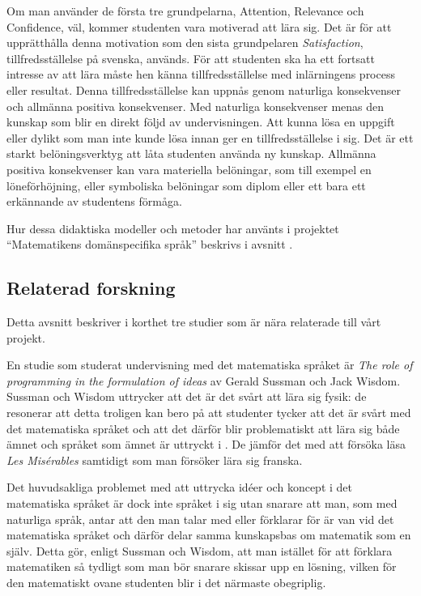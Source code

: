 \documentclass[12pt,a4paper,twoside,openright]{article}
\begin{document}
Om man använder de första tre grundpelarna, Attention, Relevance och
Confidence, väl, kommer studenten vara motiverad att lära sig. Det är
för att upprätthålla denna motivation som den sista grundpelaren
\textit{Satisfaction}, tillfredsställelse på svenska, används. För att
studenten ska ha ett fortsatt intresse av att lära måste hen känna
tillfredsställelse med inlärningens process eller resultat. Denna
tillfredsställelse kan uppnås genom naturliga konsekvenser och
allmänna positiva konsekvenser. Med naturliga konsekvenser menas den
kunskap som blir en direkt följd av undervisningen. Att kunna lösa en
uppgift eller dylikt som man inte kunde lösa innan ger en
tillfredsställelse i sig. Det är ett starkt belöningsverktyg att låta
studenten använda ny kunskap. Allmänna positiva konsekvenser kan vara
materiella belöningar, som till exempel en löneförhöjning, eller
symboliska belöningar som diplom eller ett bara ett erkännande av
studentens förmåga.

Hur dessa didaktiska modeller och metoder har använts i projektet
``Matematikens domänspecifika språk'' beskrivs i avsnitt
.

\subsection{Relaterad forskning}
\label{sec:relForsk}
Detta avsnitt beskriver i korthet tre studier som är nära relaterade
till vårt projekt.

En studie som studerat undervisning med det matematiska språket är
\textit{The role of programming in the formulation of ideas} av Gerald
Sussman och Jack Wisdom. Sussman och Wisdom uttrycker att det är det
svårt att lära sig fysik: de resonerar att detta troligen kan bero på
att studenter tycker att det är svårt med det matematiska språket och
att det därför blir problematiskt att lära sig både ämnet och språket
som ämnet är uttryckt i \cite{sussman2002role}. De jämför det med att
försöka läsa \textit{Les Misérables} samtidigt som man försöker lära
sig franska.

Det huvudsakliga problemet med att uttrycka idéer och koncept i det
matematiska språket är dock inte språket i sig utan snarare att man,
som med naturliga språk, antar att den man talar med eller förklarar
för är van vid det matematiska språket och därför delar samma
kunskapsbas om matematik som en själv. Detta gör, enligt Sussman och
Wisdom, att man istället för att förklara matematiken så tydligt som
man bör snarare skissar upp en lösning, vilken för den matematiskt
ovane studenten blir i det närmaste obegriplig.
\end{document}
